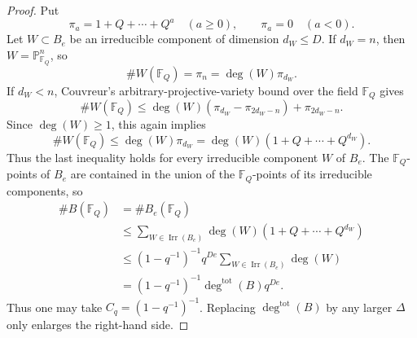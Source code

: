 \documentclass{lms}
\newcommand{\F}{\mathbb F}
\newcommand{\PP}{\mathbb P}
\begin{document}
\begin{proof}
Put
\[
        \pi_a=1+Q+\cdots+Q^a\quad(a\ge0),
        \qquad
        \pi_a=0\quad(a<0).
\]
Let $W\subset B_e$ be an irreducible component of dimension $d_W\le D$.  If $d_W=n$, then $W=\PP^n_{\F_Q}$, so
\[
        \#W(\F_Q)=\pi_n=\deg(W)\pi_{d_W}.
\]
If $d_W<n$, Couvreur's arbitrary-projective-variety bound \cite{Couvreur2015} over the field $\F_Q$ gives
\[
        \#W(\F_Q)
        \le
        \deg(W)(\pi_{d_W}-\pi_{2d_W-n})+\pi_{2d_W-n}.
\]
Since $\deg(W)\ge1$, this again implies
\[
        \#W(\F_Q)
        \le
        \deg(W)\pi_{d_W}
        =
        \deg(W)(1+Q+\cdots+Q^{d_W}).
\]
Thus the last inequality holds for every irreducible component $W$ of $B_e$.
The $\F_Q$-points of $B_e$ are contained in the union of the $\F_Q$-points of its irreducible components, so
\[
\begin{aligned}
        \#B(\F_Q)
        &=\#B_e(\F_Q)                                                     \\
        &\le
        \sum_{W\in\operatorname{Irr}(B_e)}
        \deg(W)(1+Q+\cdots+Q^{d_W})                                      \\
        &\le
        (1-q^{-1})^{-1}q^{De}
        \sum_{W\in\operatorname{Irr}(B_e)}\deg(W)                         \\
        &=
        (1-q^{-1})^{-1}\deg^{\mathrm{tot}}(B)q^{De}.
\end{aligned}
\]
Thus one may take $C_q=(1-q^{-1})^{-1}$.  Replacing $\deg^{\mathrm{tot}}(B)$ by any larger $\Delta$ only enlarges the right-hand side.
\end{proof}
\end{document}
